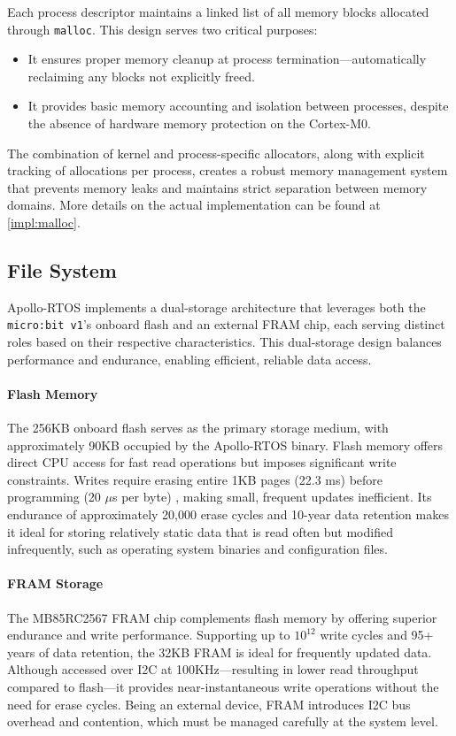 Each process descriptor maintains a linked list of all memory blocks allocated through
\lstinline[style=myagc]|malloc|. This design serves two critical purposes:
\begin{itemize}
    \item It ensures proper memory cleanup at process termination—automatically
        reclaiming any blocks not explicitly freed.
    \item It provides basic memory accounting and isolation between processes, despite
        the absence of hardware memory protection on the Cortex-M0.
\end{itemize}

The combination of kernel and process-specific allocators, along with explicit tracking
of allocations per process, creates a robust memory management system that prevents
memory leaks and maintains strict separation between memory domains. More details on
the actual implementation can be found at \autoref{impl:malloc}.


\subsection{File System}
\label{sec:fs}

Apollo-RTOS implements a dual-storage architecture that leverages both the
\texttt{micro:bit v1}'s onboard flash and an external FRAM chip, each serving distinct
roles based on their respective characteristics. This dual-storage design balances
performance and endurance, enabling efficient, reliable data access.

\paragraph*{Flash Memory} The 256KB onboard flash serves as the primary storage medium,
with approximately 90KB occupied by the Apollo-RTOS binary. Flash memory offers direct
CPU access for fast read operations but imposes significant write constraints. Writes
require erasing entire 1KB pages (22.3 ms) before programming (20 $\mu$s per byte)
\citep{board_spec}, making small, frequent updates inefficient. Its endurance of
approximately 20,000 erase cycles and 10-year data retention makes it ideal for storing
relatively static data that is read often but modified infrequently, such as operating
system binaries and configuration files.

\paragraph*{FRAM Storage} The MB85RC2567 FRAM chip \citep{fram} complements flash
memory by offering superior endurance and write performance. Supporting up to
\(10^{12}\) write cycles and 95+ years of data retention, the 32KB FRAM is ideal for
frequently updated data. Although accessed over I2C at 100KHz—resulting in lower read
throughput compared to flash—it provides near-instantaneous write operations without
the need for erase cycles. Being an external device, FRAM introduces I2C bus overhead
and contention, which must be managed carefully at the system level.

